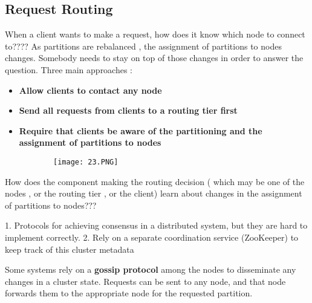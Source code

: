 \documentclass{article}
\begin{document}
\subsection{Request Routing}
When a client wants to make a request, how does it know which node to connect to????
As partitions are rebalanced , the assignment of partitions to nodes changes. Somebody needs to stay on top of those changes in order to answer the question.
Three main approaches : 
\begin{itemize}
    \item \textbf{Allow clients to contact any node} 
    \item \textbf{Send all requests from clients to a routing tier first} 
    \item \textbf{Require that clients be aware of the partitioning and the assignment of partitions to nodes} 
\end{itemize}

\begin{figure}[ht!]
  \centering
  \begin{subfigure}[b]{0.45\linewidth}
    \texttt{[image: 23.PNG]}
  \end{subfigure}
\end{figure}


How does the component making the routing decision ( which may be one of the nodes , or the routing tier , or the client) learn about changes in the assignment of partitions to nodes???

1. Protocols for achieving consensus in a distributed system, but they are hard to implement correctly.
2. Rely on a separate coordination service (ZooKeeper) to keep track of this cluster metadata

Some systems rely on a \textbf{gossip protocol} among the nodes to disseminate any changes in a cluster state. Requests can be sent to any node, and that node forwards them to the appropriate node for the requested partition. 
\end{document}

